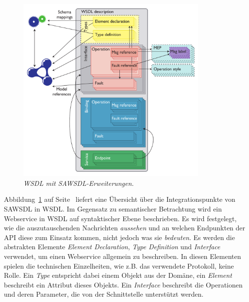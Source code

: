 \begin{figure}[ht]
\centering
\parbox{0.85\textwidth}{
    \includegraphics[width=0.85\textwidth]{media/sawsdl.png}
    \caption{\emph{\ac{WSDL} mit \ac{SAWSDL}-Erweiterungen.} \cite[S.61]{ky-sawsdl}
}
    \label{f:sawsdl}
}
\end{figure}

Abbildung~\ref{f:sawsdl} auf Seite~\pageref{f:sawsdl} liefert eine Übersicht über die Integrationspunkte von \ac{SAWSDL} in \ac{WSDL}. Im Gegensatz zu semantischer Betrachtung wird ein Webservice in \ac{WSDL} auf syntaktischer Ebene beschrieben. Es wird festgelegt, wie die auszutauschenden Nachrichten \emph{aussehen} und an welchen Endpunkten der API diese zum Einsatz kommen, nicht jedoch was sie \emph{bedeuten}. Es werden die abstrakten Elemente \emph{Element Declaration}, \emph{Type Definition} und \emph{Interface} verwendet, um einen Webservice allgemein zu beschreiben. In diesen Elementen spielen die technischen Einzelheiten, wie z.B. das verwendete Protokoll, keine Rolle. Ein \emph{Type} entspricht dabei einem Objekt aus der Domäne, ein \emph{Element} beschreibt ein Attribut dieses Objekts. Ein \emph{Interface} beschreibt die Operationen und deren Parameter, die von der Schnittstelle unterstützt werden. 

